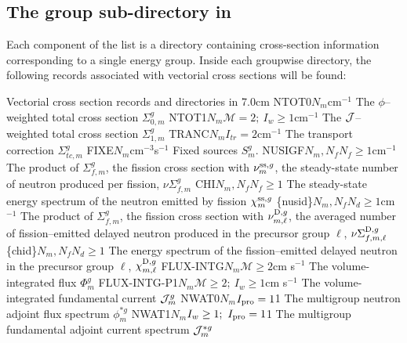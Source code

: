 \subsection{The group sub-directory  in }\label{sect:macrolibdirgroup}

Each component of the list  is a directory containing cross-section information
corresponding to a single energy group. Inside each groupwise directory, the following
records associated with vectorial cross sections will be found:

\begin{DescriptionEnregistrement}{Vectorial cross section records and directories in
}{7.0cm}
\label{tabl:tabnonlegendre}
\RealEnr
  {NTOT0}{$N_{m}$}{cm$^{-1}$}
  {The $\phi$--weighted total cross section $\Sigma_{0,m}^{g}$}
\OptRealEnr
  {NTOT1}{$N_{m}$}{$\mathcal{M}=2; \ I_{w}\ge 1$}{cm$^{-1}$}
  {The ${\cal J}$--weighted total cross section $\Sigma_{1,m}^{g}$}
\OptRealEnr
  {TRANC}{$N_{m}$}{$I_{tr}=2$}{cm$^{-1}$} 
  {The transport correction $\Sigma_{tc,m}^{g}$}
\RealEnr
  {FIXE}{$N_{m}$}{cm$^{-3}$s$^{-1}$}
  {Fixed sources $S_{m}^{g}$.}
\OptRealEnr
  {NUSIGF}{$N_{m},N_{f}$}{$N_{f}\ge 1$}{cm$^{-1}$} 
  {The product of $\Sigma_{f,m}^{g}$, the fission cross section with
   $\nu_{m}^{{\rm ss},g}$, the steady-state number of neutron produced per fission,
   $\nu\Sigma_{f,m}^{g}$}
\OptRealEnr
  {CHI}{$N_{m},N_{f}$}{$N_{f}\ge 1$}{}
  {The steady-state energy spectrum of the neutron emitted by fission $\chi_{m}^{{\rm ss},g}$}
\OptRealVar
  {\{nusid\}}{$N_{m},N_{f}$}{$N_{d}\ge 1$}{cm$^{-1}$} 
  {The product of $\Sigma_{f,m}^{g}$, the fission cross section with
   $\nu_{m,\ell}^{{\rm D},g}$, the averaged number of fission--emitted delayed
   neutron produced in the precursor group $\ell$,
   $\nu\Sigma_{f,m,\ell}^{{\rm D},g}$}
\OptRealVar
  {\{chid\}}{$N_{m},N_{f}$}{$N_{d}\ge 1$}{}
  {The energy spectrum of the fission--emitted delayed neutron
  in the precursor group $\ell$, $\chi_{m,\ell}^{{\rm D},g}$}
\OptRealEnr
  {FLUX-INTG}{$N_{m}$}{$\mathcal{M}\ge 2$}{cm s$^{-1}$}  
  {The volume-integrated flux $\Phi_{m}^{g}$}
\OptRealEnr
  {FLUX-INTG-P1}{$N_{m}$}{$\mathcal{M}\ge 2; \ I_{w}\ge 1$}{cm s$^{-1}$}  
  {The volume-integrated fundamental current ${\cal J}_{m}^{g}$}
\OptRealEnr
  {NWAT0}{$N_{m}$}{$I_{\rm pro}=1$}{1}
  {The multigroup neutron adjoint flux spectrum $\phi_{m}^{*g}$} 
\OptRealEnr
  {NWAT1}{$N_{m}$}{$I_{w}\ge 1; \ I_{\rm pro}=1$}{1}
  {The multigroup fundamental adjoint current spectrum ${\cal J}_{m}^{*g}$} 

\end{DescriptionEnregistrement}

